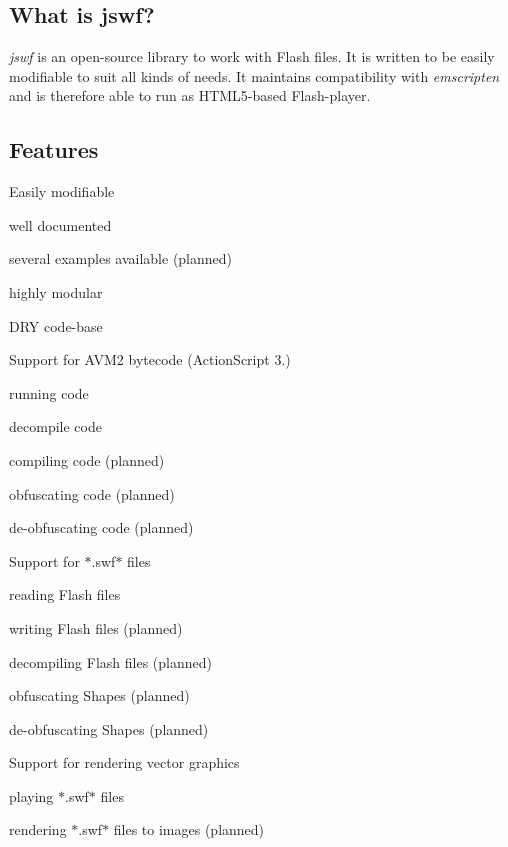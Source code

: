 \subsection*{What is jswf? }

{\itshape jswf} is an open-\/source library to work with Flash files. It is written to be easily modifiable to suit all kinds of needs. It maintains compatibility with {\itshape emscripten} and is therefore able to run as H\+T\+M\+L5-\/based Flash-\/player.

\subsection*{Features }


\begin{DoxyItemize}
\item Easily modifiable
\begin{DoxyItemize}
\item well documented
\item several examples available (planned)
\item highly modular
\item D\+R\+Y code-\/base
\end{DoxyItemize}
\item Support for A\+V\+M2 bytecode (Action\+Script 3.)
\begin{DoxyItemize}
\item running code
\item decompile code
\item compiling code (planned)
\item obfuscating code (planned)
\item de-\/obfuscating code (planned)
\end{DoxyItemize}
\item Support for $\ast$.swf$\ast$ files
\begin{DoxyItemize}
\item reading Flash files
\item writing Flash files (planned)
\item decompiling Flash files (planned)
\item obfuscating Shapes (planned)
\item de-\/obfuscating Shapes (planned)
\end{DoxyItemize}
\item Support for rendering vector graphics
\begin{DoxyItemize}
\item playing $\ast$.swf$\ast$ files
\item rendering $\ast$.swf$\ast$ files to images (planned) 
\end{DoxyItemize}
\end{DoxyItemize}